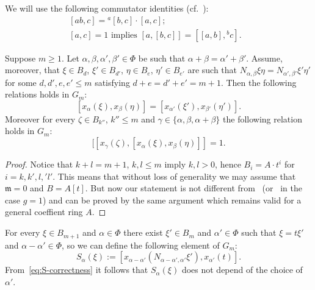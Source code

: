We will use the following commutator identities (cf.~\cite[H1]{Re75}):
\begin{align}
 \label{eq:H1ii}  [ab, c] = {}^a[b, c] \cdot [a,c];&\\ %
 \label{eq:H1iii} [a,c]   = 1    \text{ implies } [a, [b,c]] = [[a,b],{}^bc].&
\end{align}

\begin{lemma}
 Suppose $m \geq 1$.
 Let $\alpha, \beta, \alpha', \beta' \in \Phi$ be such that $\alpha + \beta = \alpha' + \beta'$.
 Assume, moreover, that $\xi \in B_d$, $\xi' \in B_{d'}$, $\eta \in B_e$, $\eta' \in B_{e'}$ are such that 
  $N_{\alpha, \beta} \xi \eta = N_{\alpha', \beta'}\xi' \eta'$ for some $d,d',e,e'\leq m$ satisfying $d+e=d'+e' = m+1$.
 Then the following relations holds in $G_m$:
 \begin{equation}
  \label{eq:S-correctness} [x_\alpha(\xi), x_\beta(\eta)] = [x_{\alpha'}(\xi'), x_{\beta'}(\eta')].
 \end{equation}
 Moreover for every $\zeta \in B_{k''}$, $k''\leq m$ and $\gamma\in\{\alpha, \beta, \alpha + \beta\}$
  the following relation holds in $G_m$:
 \begin{equation}
 \label{eq:S-commutes} [[x_\gamma(\zeta), [x_\alpha(\xi), x_\beta(\eta)]] = 1.
 \end{equation}
\end{lemma}
\begin{proof}
 Notice that $k+l = m+1$, $k, l\leq m$ imply $k,l>0$, hence $B_i= A \cdot t^i$ for $i=k,k',l,'l'$.
 This means that without loss of generality we may assume that $\mathfrak{m}=0$ and $B = A[t]$.
 But now our statement is not different from~\cite[Proposition 1.1]{Re75} (or~\cite[Proposition~3.2.2]{RS76} in the case $g=1$)
  and can be proved by the same argument which remains valid for a general coeffient ring $A$.
\end{proof}

For every $\xi \in B_{m+1}$ and $\alpha\in \Phi$ there exist $\xi' \in B_m$ and $\alpha'\in \Phi$ such that $\xi = t\xi'$ and $\alpha-\alpha'\in\Phi$,
so we can define the following element of $G_m$:
\begin{equation} \label{eq:S-definition} S_\alpha(\xi) := [x_{\alpha-\alpha'}(N_{\alpha-\alpha',\alpha'} \xi'), x_{\alpha'}(t)].\end{equation} 
From~\eqref{eq:S-correctness} it follows that $S_\alpha(\xi)$ does not depend of the choice of $\alpha'$.

